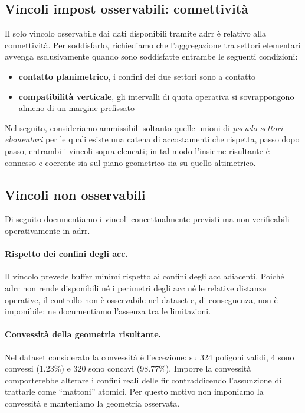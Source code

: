 \subsection{Vincoli impost osservabili: connettività}
Il solo vincolo osservabile dai dati disponibili tramite \gls{adrr} è relativo alla connettività. Per soddisfarlo, richiediamo che l’aggregazione tra settori elementari avvenga esclusivamente quando sono soddisfatte entrambe le seguenti condizioni:
\begin{itemize}
  \item \textbf{contatto planimetrico}, i confini dei due settori sono a contatto
  \item \textbf{compatibilità verticale}, gli intervalli di quota operativa si sovrappongono almeno di un margine prefissato
\end{itemize}
Nel seguito, consideriamo ammissibili soltanto quelle unioni di \emph{pseudo-settori elementari} per le quali esiste una catena di accostamenti che rispetta, passo dopo passo, entrambi i vincoli sopra elencati; in tal modo l’insieme risultante è connesso e coerente sia sul piano geometrico sia su quello altimetrico.

\subsection{Vincoli non osservabili}
Di seguito documentiamo i vincoli concettualmente previsti ma non verificabili operativamente in \gls{adrr}.
\paragraph{Rispetto dei confini degli \gls{acc}.}
Il vincolo prevede buffer minimi rispetto ai confini degli \gls{acc} adiacenti. Poiché \gls{adrr} non rende disponibili né i perimetri degli \gls{acc} né le relative distanze operative, il controllo non è osservabile nel dataset e, di conseguenza, non è imponibile; ne documentiamo l’assenza tra le limitazioni.

\paragraph{Convessità della geometria risultante.}
Nel dataset considerato la convessità è l’eccezione: su 324 poligoni validi, 4 sono convessi (1.23\%) e 320 sono concavi (98.77\%). Imporre la convessità comporterebbe alterare i confini reali delle \gls{fir} contraddicendo l’assunzione di trattarle come ``mattoni'' atomici. Per questo motivo non imponiamo la convessità e manteniamo la geometria osservata.

